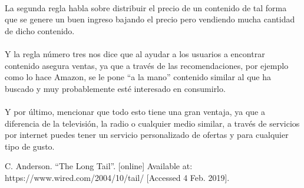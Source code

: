 \documentclass{article}
\begin{document}
\paragraph{}
La segunda regla habla sobre distribuir el precio de un contenido de tal forma
que se genere un buen ingreso bajando el precio pero vendiendo mucha cantidad
de dicho contenido.

\paragraph{}
Y la regla número tres nos dice que al ayudar a los usuarios a encontrar contenido
asegura ventas, ya que a través de las recomendaciones, por ejemplo como lo hace
Amazon, se le pone ``a la mano'' contenido similar al que ha buscado y muy
probablemente esté interesado en consumirlo.

\paragraph{}
Y por último, mencionar que todo esto tiene una gran ventaja, ya que a diferencia
de la televisión, la radio o cualquier medio similar, a través de servicios por
internet puedes tener un servicio personalizado de ofertas y para cualquier tipo
de gusto.

\begin{thebibliography}{}
	C. Anderson. ``The Long Tail''.
	[online] Available at: https://www.wired.com/2004/10/tail/
	[Accessed 4 Feb. 2019].
\end{thebibliography}
\end{document}

